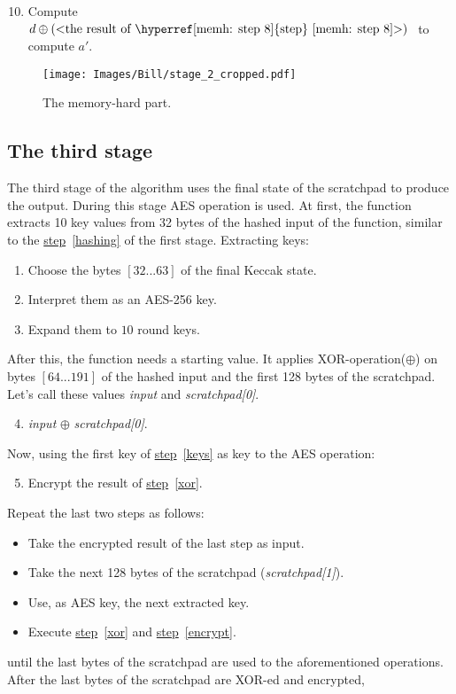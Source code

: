 \begin{enumerate}
  \setcounter{enumi}{9}
  \item Compute $d \oplus \mbox{(<the result of \hyperref[memh: step 8]{step}~\ref{memh: step 8}>) }$ to compute $a'$.
\end{enumerate}
\clearpage

\begin{figure}[H]
  \centering
  \texttt{[image: Images/Bill/stage\_2\_cropped.pdf]}
  \caption{The memory-hard part.~\cite{bill}}
  \label{fig:stage2}
\end{figure}

\subsection{The third stage}
The third stage of the algorithm uses the final state of the scratchpad to produce the output. During this stage AES operation is used. At first, the function extracts 10 key values from 32 bytes of the hashed input of the function, similar to the \hyperref[hashing]{step}~\ref{hashing} of the first stage. Extracting keys:
\begin{enumerate}
  \item Choose the bytes $[32...63]$ of the final Keccak state.
  \item Interpret them as an AES-256 key.
  \item \label{keys} Expand them to $10$ round keys.
\end{enumerate}
After this, the function needs a starting value. It applies XOR-operation($\oplus$) on bytes $[64...191]$ of the hashed input and the first 128 bytes of the scratchpad. Let's call these values \emph{input} and \emph{scratchpad[0]}.

\begin{enumerate}
  \setcounter{enumi}{3}
  \item \label{xor} \emph{input} $\oplus$ \emph{scratchpad[0]}.
\end{enumerate}
Now, using the first key of \hyperref[keys]{step}~\ref{keys} as key to the AES operation:

\begin{enumerate}
  \setcounter{enumi}{4}
  \item \label{encrypt} Encrypt the result of \hyperref[xor]{step}~\ref{xor}.
\end{enumerate}
Repeat the last two steps as follows:

\begin{itemize}
  \item Take the encrypted result of the last step as input.
  \item Take the next 128 bytes of the scratchpad (\emph{scratchpad[1]}).
  \item Use, as AES key, the next extracted key.
  \item Execute \hyperref[xor]{step}~\ref{xor} and \hyperref[encrypt]{step}~\ref{encrypt}.
\end{itemize}
until the last bytes of the scratchpad are used to the aforementioned operations. After the last bytes of the scratchpad are XOR-ed and encrypted,

